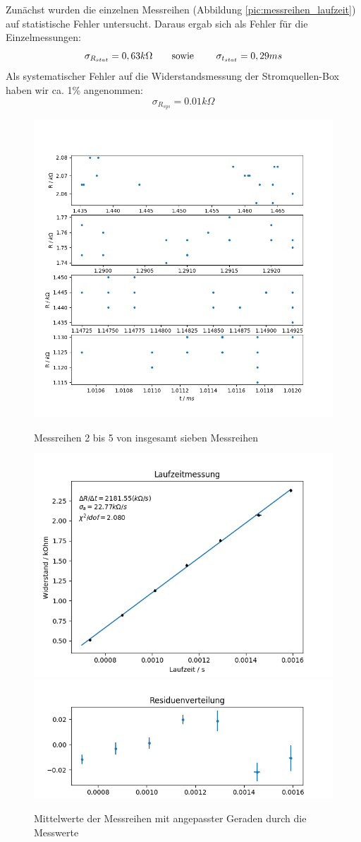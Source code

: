 \documentclass[a4paper]{article}
\begin{document}
	Zunächst wurden die einzelnen Messreihen (Abbildung \ref{pic:messreihen_laufzeit}) auf statistische Fehler untersucht. Daraus ergab sich als Fehler für die Einzelmessungen:
	\begin{equation}
	\sigma _{R_{stat}} = 0,63 k\Omega \text{\qquad sowie \qquad} \sigma_{t_{stat}} = 0,29 ms
	\end{equation}
	Als systematischer Fehler auf die Widerstandsmessung der Stromquellen-Box haben wir ca. 1\% angenommen: 
	\begin{equation}
	\sigma_{R_{sys}} = 0.01 k \Omega
	\end{equation}
	\begin{figure}
	\begin{center}
		\includegraphics[width=0.6\linewidth]{messreihen_2bis5_laufzeit}
		\caption{Messreihen 2 bis 5 von insgesamt sieben Messreihen}
		\label{pic:messreihen_laufzeit}
		
		\includegraphics[width=0.6\linewidth]{fit_laufzeit}
		\includegraphics[width=0.6\linewidth]{residuen_laufzeit}
		\caption{Mittelwerte der Messreihen mit angepasster Geraden durch die Messwerte}
		\label{pic:fit_laufzeit}
		
		
	\end{center}
	\end{figure}
\end{document}

